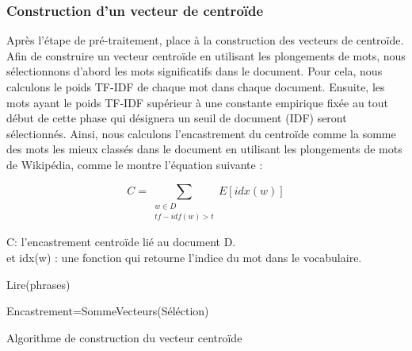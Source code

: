        \subsubsection{Construction d'un vecteur de centroïde}
        Après l'étape de pré-traitement, place à la construction des vecteurs de centroïde. Afin de construire un vecteur centroïde en utilisant les plongements de mots, nous sélectionnons d'abord les mots significatifs dans le document. Pour cela, nous calculons le poids TF-IDF de chaque mot dans chaque document. Ensuite, les mots ayant le poids TF-IDF supérieur à une constante empirique fixée au tout début de cette phase qui désignera un seuil de document (IDF) seront sélectionnés. Ainsi, nous calculons l'encastrement du centroïde comme la somme des mots les mieux classés dans le document en utilisant les plongements de mots de Wikipédia, comme le montre l'équation suivante :

             \begin{equation*}
             C = \sum_{\substack{w\in D\\
                             tf-idf(w)>t }}
                    E[idx(w)]
             \end{equation*}
             
             C: l'encastrement centroïde lié au document D.\\
             et idx(w) : une fonction qui retourne l'indice du mot dans le vocabulaire.\\
             
             \begin{algorithm2e}[H]
                \SetAlgoLined
                
                Lire(phrases)\\
                
                Encastrement=SommeVecteurs(Séléction)
                
                \caption{Algorithme de construction du vecteur centroïde}
             \end{algorithm2e}
             
